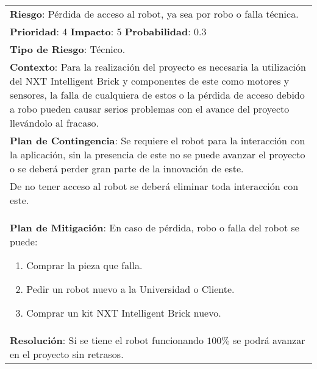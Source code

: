 \begin{table}[htbp!]
  \begin{tabular}{|p{15cm}|}\hline
    {\bf Riesgo}: P\'erdida de acceso al robot, ya sea por robo o falla t\'ecnica.\\%
    {\bf Prioridad}: 4  {\bf Impacto}: 5  {\bf Probabilidad}: 0.3\\%
    {\bf Tipo de Riesgo}: T\'ecnico.\\%
    {\bf Contexto}: Para la realizaci\'on del proyecto es necesaria la utilizaci\'on del NXT Intelligent Brick y componentes de este como motores y sensores, la falla de cualquiera de estos o la p\'erdida de acceso debido a robo pueden causar serios problemas con el avance del proyecto llev\'andolo al fracaso.\\%
    {\bf Plan de Contingencia}: Se requiere el robot para la interacci\'on con la aplicaci\'on, sin la presencia de este no se puede avanzar el proyecto o se deber\'a perder gran parte de la innovaci\'on de este.\\De no tener acceso al robot se deber\'a eliminar toda interacci\'on con este.\\%
    {\bf Plan de Mitigaci\'on}: En caso de p\'erdida, robo o falla del robot se puede:\begin{enumerate}\item Comprar la pieza que falla.\item Pedir un robot nuevo a la Universidad o Cliente.\item Comprar un kit NXT Intelligent Brick nuevo.\end{enumerate}\\%
    {\bf Resoluci\'on}: Si se tiene el robot funcionando $100\%$ se podr\'a avanzar en el proyecto sin retrasos.\\\hline
  \end{tabular}
  \caption{}
  \label{table:R4}
\end{table}

\newpage
